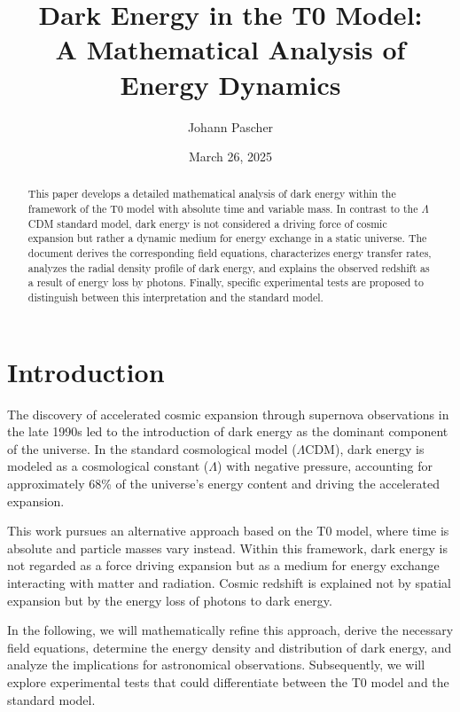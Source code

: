 \documentclass[a4paper,12pt]{article}
\begin{document}
\title{Dark Energy in the T0 Model: \\A Mathematical Analysis of Energy Dynamics}
\author{Johann Pascher}
\date{March 26, 2025}
\maketitle

\begin{abstract}
	This paper develops a detailed mathematical analysis of dark energy within the framework of the T0 model with absolute time and variable mass. In contrast to the $\Lambda$CDM standard model, dark energy is not considered a driving force of cosmic expansion but rather a dynamic medium for energy exchange in a static universe. The document derives the corresponding field equations, characterizes energy transfer rates, analyzes the radial density profile of dark energy, and explains the observed redshift as a result of energy loss by photons. Finally, specific experimental tests are proposed to distinguish between this interpretation and the standard model.
\end{abstract}

\tableofcontents
\newpage

\section{Introduction}

The discovery of accelerated cosmic expansion through supernova observations in the late 1990s led to the introduction of dark energy as the dominant component of the universe. In the standard cosmological model ($\Lambda$CDM), dark energy is modeled as a cosmological constant ($\Lambda$) with negative pressure, accounting for approximately 68\% of the universe's energy content and driving the accelerated expansion.

This work pursues an alternative approach based on the T0 model, where time is absolute and particle masses vary instead. Within this framework, dark energy is not regarded as a force driving expansion but as a medium for energy exchange interacting with matter and radiation. Cosmic redshift is explained not by spatial expansion but by the energy loss of photons to dark energy.

In the following, we will mathematically refine this approach, derive the necessary field equations, determine the energy density and distribution of dark energy, and analyze the implications for astronomical observations. Subsequently, we will explore experimental tests that could differentiate between the T0 model and the standard model.
\end{document}
